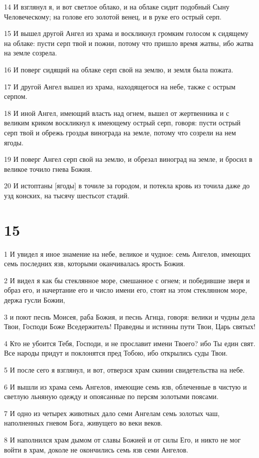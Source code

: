 \par 14 И взглянул я, и вот светлое облако, и на облаке сидит подобный Сыну Человеческому; на голове его золотой венец, и в руке его острый серп.
\par 15 И вышел другой Ангел из храма и воскликнул громким голосом к сидящему на облаке: пусти серп твой и пожни, потому что пришло время жатвы, ибо жатва на земле созрела.
\par 16 И поверг сидящий на облаке серп свой на землю, и земля была пожата.
\par 17 И другой Ангел вышел из храма, находящегося на небе, также с острым серпом.
\par 18 И иной Ангел, имеющий власть над огнем, вышел от жертвенника и с великим криком воскликнул к имеющему острый серп, говоря: пусти острый серп твой и обрежь гроздья винограда на земле, потому что созрели на нем ягоды.
\par 19 И поверг Ангел серп свой на землю, и обрезал виноград на земле, и бросил в великое точило гнева Божия.
\par 20 И истоптаны [ягоды] в точиле за городом, и потекла кровь из точила даже до узд конских, на тысячу шестьсот стадий.

\chapter{15}

\par 1 И увидел я иное знамение на небе, великое и чудное: семь Ангелов, имеющих семь последних язв, которыми оканчивалась ярость Божия.
\par 2 И видел я как бы стеклянное море, смешанное с огнем; и победившие зверя и образ его, и начертание его и число имени его, стоят на этом стеклянном море, держа гусли Божии,
\par 3 и поют песнь Моисея, раба Божия, и песнь Агнца, говоря: велики и чудны дела Твои, Господи Боже Вседержитель! Праведны и истинны пути Твои, Царь святых!
\par 4 Кто не убоится Тебя, Господи, и не прославит имени Твоего? ибо Ты един свят. Все народы придут и поклонятся пред Тобою, ибо открылись суды Твои.
\par 5 И после сего я взглянул, и вот, отверзся храм скинии свидетельства на небе.
\par 6 И вышли из храма семь Ангелов, имеющие семь язв, облеченные в чистую и светлую льняную одежду и опоясанные по персям золотыми поясами.
\par 7 И одно из четырех животных дало семи Ангелам семь золотых чаш, наполненных гневом Бога, живущего во веки веков.
\par 8 И наполнился храм дымом от славы Божией и от силы Его, и никто не мог войти в храм, доколе не окончились семь язв семи Ангелов.

